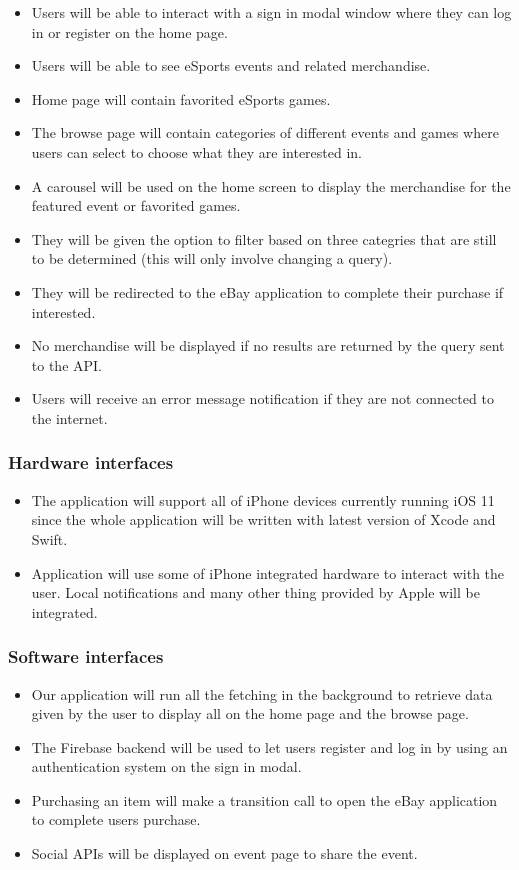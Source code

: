 \documentclass[onecolumn, draftclsnofoot,10pt, compsoc]{IEEEtran}
\begin{document}
\begin{itemize}
\item Users will be able to interact with a sign in modal window where they can log in or register on the home page.
\item Users will be able to see eSports events and related merchandise. 
\item Home page will contain favorited eSports games.
\item The browse page will contain categories of different events and games where users can select to choose what they are interested in.
\item A carousel will be used on the home screen to display the merchandise for the featured event or favorited games.
\item They will be given the option to filter based on three categries that are still to be determined (this will only involve changing a query).
\item They will be redirected to the eBay application to complete their purchase if interested.
\item No merchandise will be displayed if no results are returned by the query sent to the API.
\item Users will receive an error message notification if they are not connected to the internet.
\end{itemize}

\subsubsection{Hardware interfaces}
\begin{itemize}
\item The application will support all of iPhone devices currently running iOS 11 since the whole application will be written with latest version of Xcode and Swift.
\item Application will use some of iPhone integrated hardware to interact with the user. Local notifications and many other thing provided by Apple will be integrated. 
\end{itemize}

\subsubsection{Software interfaces}
\begin{itemize}
\item Our application will run all the fetching in the background to retrieve data given by the user to display all on the home page and the browse page.
\item The Firebase backend will be used to let users register and log in by using an authentication system on the sign in modal. 
\item Purchasing an item will make a transition call to open the eBay application to complete users purchase.
\item Social APIs will be displayed on event page to share the event.
\end{itemize}
\end{document}
